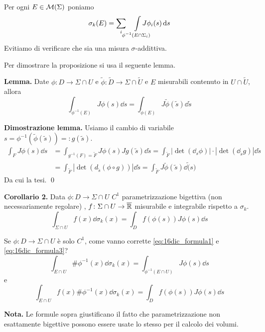 Per ogni $E \in \mathcal{M}(\Sigma)$ poniamo 
%
$$
	\sigma_k (E) = \sum_i \quad  \int\limits_{\mathclap{\phi^{-1}(E \cap \Sigma_i)}} J \phi_i(s) \dd s
$$
%
Evitiamo di verificare che sia una misura $\sigma$-addittiva.

Per dimostrare la proposizione si usa il seguente lemma.

\textbf{Lemma.} Date $\phi \colon D \to \Sigma \cap U$ e $\tilde{\phi} \colon \tilde{D} \to \Sigma \cap \tilde{U}$ e $E$ misurabili contenuto in $U \cap \tilde{U}$, allora
%
\begin{equation}
	\label{eq:16dic_formula2} \tag{2}
	\int_{\phi^{-1}(E)} J\phi(s) \dd s = \int_{\tilde{\phi}(E)} J\tilde{\phi}(\tilde{s}) \dd \tilde{s}
\end{equation}
%

\textbf{Dimostrazione lemma.} Usiamo il cambio di variabile $s = \phi^{-1}(\tilde{\phi}(\tilde{s})) =: g(\tilde{s})$.
\begin{align*}
	\int_F J\phi(s) \dd s & = \int_{g^{-1}(F) = \tilde{F}} J\phi(s) Jg(\tilde{s}) \dd \tilde{s}
	= \int_{\tilde{F}} |\det(\dd_s \phi)| \cdot | \det(\dd_{\tilde{s}}g)| \dd \tilde{s} \\
	& = \int_{\tilde{F}} \left| \det (d_{\tilde{s}}(\phi \circ g)) \right| \dd \tilde{s}
	= \int_{\tilde{F}} J \tilde{\phi}(\tilde{s}) \dd \tilde(s)
\end{align*}
%
Da cui la tesi.
\qed

\textbf{Corollario 2.} Data $\phi \colon D \to \Sigma \cap U$ $C^1$ parametrizzazione bigettiva (non necessariamente regolare) , $f \colon \Sigma \cap U \to \overline{\mathbb R}$ misurabile e integrabile rispetto a $\sigma_k$.
%
\begin{equation}
	\label{eq:16dic_formula3} \tag{3}
	\int_{\Sigma \cap U} f(x) \dd \sigma_k(x) = \int_D f(\phi(s)) J\phi(s) \dd s
\end{equation}

Se $\phi \colon D \to \Sigma \cap U$ è solo $C^1$, come vanno corrette \eqref{eq:16dic_formula1} e \eqref{eq:16dic_formula3}?
\begin{equation}
	\tag{1'}
	\int_{E \cap U} \# \phi^{-1}(x) \dd \sigma_k(x) = \int_{\phi^{-1}(E \cap U)} J\phi(s) \dd s
\end{equation}
e
\begin{equation}
	\tag{3'}
	\int_{E \cap U} f(x) \# \phi^{-1}(x) \dd \sigma_k (x) = \int_D f(\phi(s)) J\phi(s) \dd s
\end{equation}

\textbf{Nota.} Le formule sopra giustificano il fatto che parametrizzazione non esattamente bigettive possono essere usate lo stesso per il calcolo dei volumi.

